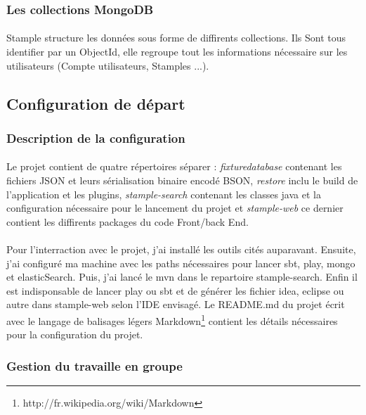 \subsubsection{Les collections MongoDB}
\paragraph{}
Stample structure les données sous forme de diffirents collections.
Ils Sont tous identifier par un ObjectId, elle regroupe tout les informations nécessaire sur les utilisateurs (Compte utilisateurs, Stamples ...).
\subsection{Configuration de départ}
\subsubsection{Description de la configuration}
\paragraph{}
Le projet contient de quatre répertoires séparer : \textit{fixturedatabase} contenant les fichiers JSON et leurs sérialisation binaire encodé BSON, \textit{restore} inclu le build de l'application et les plugins, \textit{stample-search} contenant les classes java et la configuration nécessaire pour le lancement du projet et \textit{stample-web} ce dernier contient les diffirents packages du code Front/back End.
\paragraph{}
Pour l'interraction avec le projet, j'ai installé les outils cités auparavant. Ensuite, j'ai configuré ma machine avec les paths nécessaires pour lancer sbt, play, mongo et elasticSearch. Puis, j'ai lancé le mvn dans le repartoire stample-search. Enfin il est indisponsable de lancer play ou sbt et de générer les fichier idea, eclipse ou autre dans stample-web selon l'IDE envisagé.    
Le README.md du projet écrit avec le langage de balisages légers Markdown\footnote{http://fr.wikipedia.org/wiki/Markdown} contient les détails nécessaires pour la configuration du projet.
\newpage
 
\subsubsection{Gestion du travaille en groupe}
